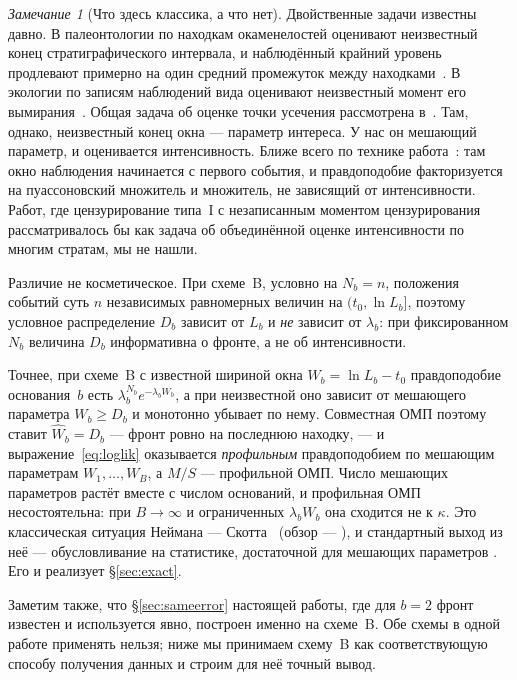 \documentclass[11pt,a4paper]{article}
\theoremstyle{plain}
\theoremstyle{remark}
\newtheorem{remark}{Замечание}
\begin{document}
\begin{remark}[Что здесь классика, а что нет]
Двойственные задачи известны давно. В палеонтологии по находкам окаменелостей
оценивают неизвестный конец стратиграфического интервала, и наблюдённый крайний
уровень продлевают примерно на один средний промежуток между
находками~\cite{straussSadler1989,marshall1990}. В экологии по записям
наблюдений вида оценивают неизвестный момент его вымирания~\cite{solow1993}.
Общая задача об оценке точки усечения рассмотрена в~\cite{robsonwhitlock1964}.
Там, однако, неизвестный конец окна --- параметр интереса. У нас он мешающий
параметр, и оценивается интенсивность. Ближе всего по технике
работа~\cite{liu2023}: там окно наблюдения начинается с первого события, и
правдоподобие факторизуется на пуассоновский множитель и множитель, не зависящий
от интенсивности. Работ, где цензурирование типа~I с незаписанным моментом
цензурирования рассматривалось бы как задача об объединённой оценке
интенсивности по многим стратам, мы не нашли.
\end{remark}

Различие не косметическое. При схеме~B, условно на $N_b=n$, положения событий суть
$n$ независимых равномерных величин на $(t_0,\ln L_b]$, поэтому условное распределение
$D_b$ зависит от $L_b$ и \emph{не} зависит от $\lambda_b$: при фиксированном $N_b$
величина $D_b$ информативна о фронте, а не об интенсивности.

Точнее, при схеме~B с известной шириной окна $W_b=\ln L_b-t_0$ правдоподобие
основания~$b$ есть $\lambda_b^{N_b}e^{-\lambda_bW_b}$, а при неизвестной оно
зависит от мешающего параметра $W_b\ge D_b$ и монотонно убывает по нему. Совместная
ОМП поэтому ставит $\hat W_b=D_b$ --- фронт ровно на последнюю находку, --- и
выражение~\eqref{eq:loglik} оказывается \emph{профильным} правдоподобием по
мешающим параметрам $W_1,\dots,W_B$, а $M/S$ --- профильной ОМП. Число мешающих
параметров растёт вместе с числом оснований, и профильная ОМП несостоятельна:
при $B\to\infty$ и ограниченных $\lambda_bW_b$ она сходится не к $\kappa$. Это
классическая ситуация Неймана --- Скотта~\cite{neymanscott1948}
(обзор --- \cite{lancaster2000}), и стандартный выход из неё --- обусловливание
на статистике, достаточной для мешающих параметров
\cite{kalbfleischsprott1970,andersen1970}. Его и реализует \S\ref{sec:exact}.

Заметим также, что \S\ref{sec:sameerror} настоящей работы, где для $b=2$ фронт известен
и используется явно, построен именно на схеме~B. Обе схемы в одной работе применять
нельзя; ниже мы принимаем схему~B как соответствующую способу получения данных
и строим для неё точный вывод.
\end{document}

